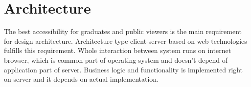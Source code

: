 \documentclass{iitsrc}[2006/14/02]
\begin{document}
\section{Architecture}


The best accessibility for graduates and public viewers is the main requirement for design architecture. Architecture type client-server based on web technologies fulfills this requirement. Whole interaction between system runs on internet browser, which is common part of operating system and doesn’t depend of application part of server. Business logic and functionality is implemented right on server and it depends on actual implementation.
\end{document}

